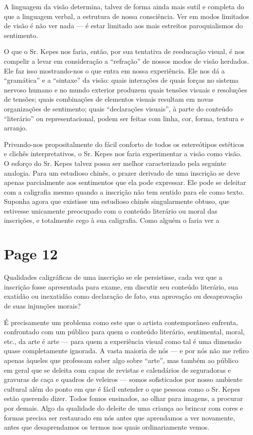 \documentclass[a4paper]{article}
\begin{document}
A linguagem da visão determina, talvez de forma ainda mais sutil e completa do que a linguagem verbal, a estrutura de nossa consciência. Ver em modos limitados de visão é não ver nada --- é estar limitado aos mais estreitos paroquialismos do sentimento.

O que o Sr. Kepes nos faria, então, por sua tentativa de reeducação visual, é nos compelir a levar em consideração a ``refração'' de nossos modos de visão herdados. Ele faz isso mostrando-nos o que entra em nossa experiência. Ele nos dá a ``gramática'' e a ``sintaxe'' da visão: quais interações de quais forças no sistema nervoso humano e no mundo exterior produzem quais tensões visuais e resoluções de tensões; quais combinações de elementos visuais resultam em novas organizações de sentimento; quais ``declarações visuais'', à parte do conteúdo ``literário'' ou representacional, podem ser feitas com linha, cor, forma, textura e arranjo.

Privando-nos propositalmente do fácil conforto de todos os estereótipos estéticos e clichês interpretativos, o Sr. Kepes nos faria experimentar a visão como visão. O esforço do Sr. Kepes talvez possa ser melhor caracterizado pela seguinte analogia. Para um estudioso chinês, o prazer derivado de uma inscrição se deve apenas parcialmente aos sentimentos que ela pode expressar. Ele pode se deleitar com a caligrafia mesmo quando a inscrição não tem sentido para ele como texto. Suponha agora que existisse um estudioso chinês singularmente obtuso, que estivesse unicamente preocupado com o conteúdo literário ou moral das inscrições, e totalmente cego à sua caligrafia. Como alguém o faria ver a

\newpage
\section*{Page 12}

Qualidades caligráficas de uma inscrição se ele persistisse, cada vez que a inscrição fosse apresentada para exame, em discutir seu conteúdo literário, sua exatidão ou inexatidão como declaração de fato, sua aprovação ou desaprovação de suas injunções morais?

É precisamente um problema como este que o artista contemporâneo enfrenta, confrontado com um público para quem o conteúdo literário, sentimental, moral, etc., da arte é arte --- para quem a experiência visual como tal é uma dimensão quase completamente ignorada. A vasta maioria de nós --- e por nós não me refiro apenas àqueles que professam saber algo sobre ``arte'', mas também ao público em geral que se deleita com capas de revistas e calendários de seguradoras e gravuras de caça e quadros de veleiros --- somos sofisticados por nosso ambiente cultural além do ponto em que é fácil entender o que pessoas como o Sr. Kepes estão querendo dizer. Todos fomos ensinados, ao olhar para imagens, a procurar por demais. Algo da qualidade do deleite de uma criança ao brincar com cores e formas precisa ser restaurado em nós antes que aprendamos a ver novamente, antes que desaprendamos os termos nos quais ordinariamente vemos.
\end{document}
